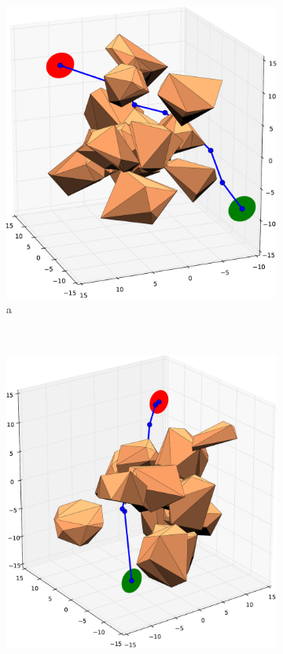 \documentclass[12pt]{article}
\begin{document}
\begin{figure}[t!]
    \centering
    \begin{subfigure}[t]{0.32\textwidth}
        \centering
        \includegraphics[width=\textwidth]{3d_example_1.pdf}
        \caption{a}
    \end{subfigure}%
    ~ 
    \begin{subfigure}[t]{0.32\textwidth}
        \centering
        \includegraphics[width=\textwidth]{3d_example_2.pdf}

\end{subfigure}
\end{figure}
\end{document}
